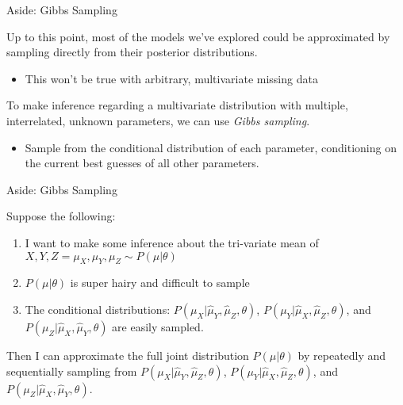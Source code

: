 \documentclass{beamer}\usepackage[]{graphicx}\usepackage[]{color}
\begin{document}
\begin{frame}{Aside: Gibbs Sampling}
  
  Up to this point, most of the models we've explored could be approximated by 
  sampling directly from their posterior distributions.
  \vc
  \begin{itemize}
    \item This won't be true with arbitrary, multivariate missing data
  \end{itemize}
  \va 
  To make inference regarding a multivariate distribution with multiple, 
  interrelated, unknown parameters, we can use \emph{Gibbs sampling}.
  \vc
  \begin{itemize}
  \item Sample from the conditional distribution of each parameter, conditioning 
    on the current best guesses of all other parameters.
  \end{itemize}
  
\end{frame}


\begin{frame}{Aside: Gibbs Sampling}
  
  Suppose the following:
  \vb
  \begin{enumerate}
  \item I want to make some inference about the tri-variate mean of
    $X, Y, Z = \mu_X, \mu_Y, \mu_Z \sim P(\mu | \theta)$
    \vb
  \item $P(\mu | \theta)$ is super hairy and difficult to sample
    \vb
  \item The conditional distributions:
    $P(\mu_X | \hat{\mu}_Y, \hat{\mu}_Z, \theta)$,
    $P(\mu_Y | \hat{\mu}_X, \hat{\mu}_Z, \theta)$, and
    $P(\mu_Z | \hat{\mu}_X, \hat{\mu}_Y, \theta)$ are easily sampled.
  \end{enumerate}
  \va
  Then I can approximate the full joint distribution
  $P(\mu | \theta)$ by repeatedly and sequentially sampling from
  $P(\mu_X | \hat{\mu}_Y, \hat{\mu}_Z, \theta)$, $P(\mu_Y |
  \hat{\mu}_X, \hat{\mu}_Z, \theta)$, and $P(\mu_Z | \hat{\mu}_X,
  \hat{\mu}_Y, \theta)$.

\end{frame}
  
\end{document}
